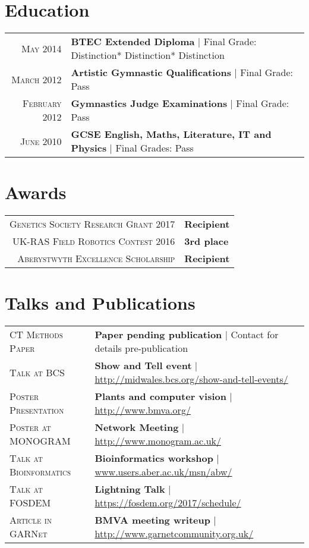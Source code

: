 \documentclass[a4paper,9pt]{article}
\begin{document}
\section{Education}
\begin{tabular}{rl}	
  \textsc{May} 2014& \textbf{BTEC Extended Diploma} | Final Grade: Distinction* Distinction* Distinction
  \\
  \textsc{March} 2012& \textbf{Artistic Gymnastic Qualifications} | Final Grade: Pass
  \\
  \textsc{February} 2012& \textbf{Gymnastics Judge Examinations} | Final Grade: Pass
  \\
  \textsc{June} 2010& \textbf{GCSE English, Maths, Literature, IT and Physics} | Final Grades: Pass
\end{tabular}


\section{Awards}
\begin{tabular}{rl}	
  \textsc{Genetics Society Research Grant 2017}& \textbf{Recipient}
  \\
  \textsc{UK-RAS Field Robotics Contest 2016}& \textbf{3rd place}
  \\
  \textsc{Aberystwyth Excellence Scholarship}& \textbf{Recipient}
\end{tabular}


\section{Talks and Publications}
\begin{tabular}{ll}	
  \textsc{CT Methods Paper} & \textbf{Paper pending publication} | Contact for details pre-publication\\
  \textsc{Talk at BCS} & \textbf{Show and Tell event} | \href{http://www.midwales.bcs.org/show-and-tell-events/}{http://midwales.bcs.org/show-and-tell-events/}\\
  \textsc{Poster Presentation} & \textbf{Plants and computer vision} | \href{http://www.bmva.org/}{http://www.bmva.org/}\\
  \textsc{Poster at MONOGRAM} & \textbf{Network Meeting} | \href{http://www.monogram.ac.uk/}{http://www.monogram.ac.uk/}\\ 
  \textsc{Talk at Bioinformatics} & \textbf{Bioinformatics workshop} | \href{www.users.aber.ac.uk/msn/abw/index.html}{www.users.aber.ac.uk/msn/abw/} \\
  \textsc{Talk at FOSDEM} & \textbf{Lightning Talk} | \href{https://fosdem.org/2017/schedule/}{https://fosdem.org/2017/schedule/}\\
  \textsc{Article in GARNet} & \textbf{BMVA meeting writeup} | \href{http://www.garnetcommunity.org.uk}{http://www.garnetcommunity.org.uk/}                         
\end{tabular}
\end{document}
